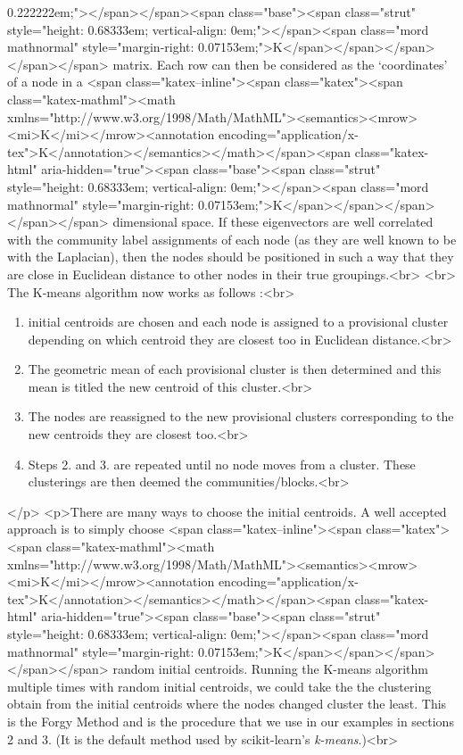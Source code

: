 0.222222em;"></span></span><span class="base"><span class="strut" style="height: 0.68333em; vertical-align: 0em;"></span><span class="mord mathnormal" style="margin-right: 0.07153em;">K</span></span></span></span></span> matrix. Each row can then be considered as the ‘coordinates’ of a node in a <span class="katex--inline"><span class="katex"><span class="katex-mathml"><math xmlns="http://www.w3.org/1998/Math/MathML"><semantics><mrow><mi>K</mi></mrow><annotation encoding="application/x-tex">K</annotation></semantics></math></span><span class="katex-html" aria-hidden="true"><span class="base"><span class="strut" style="height: 0.68333em; vertical-align: 0em;"></span><span class="mord mathnormal" style="margin-right: 0.07153em;">K</span></span></span></span></span> dimensional space. If these eigenvectors are well correlated with the community label assignments of each node (as they are well known to be with the Laplacian), then the nodes should be positioned in such a way that they are close in Euclidean distance to other nodes in their true groupings.<br>
\newline<br>
The K-means algorithm now works as follows \cite{MacQueen1967}:<br>
\begin{enumerate}<br>
\item initial centroids are chosen and each node is assigned to a provisional cluster depending on which centroid they are closest too in Euclidean distance.<br>
\item The geometric mean of each provisional cluster is then determined and this mean is titled the new centroid of this cluster.<br>
\item The nodes are reassigned to the new provisional clusters corresponding to the new centroids they are closest too.<br>
\item Steps 2. and 3. are repeated until no node moves from a cluster. These clusterings are then deemed the communities/blocks.<br>
\end{enumerate}</p>
<p>There are many ways to choose the initial centroids. A well accepted approach is to simply choose <span class="katex--inline"><span class="katex"><span class="katex-mathml"><math xmlns="http://www.w3.org/1998/Math/MathML"><semantics><mrow><mi>K</mi></mrow><annotation encoding="application/x-tex">K</annotation></semantics></math></span><span class="katex-html" aria-hidden="true"><span class="base"><span class="strut" style="height: 0.68333em; vertical-align: 0em;"></span><span class="mord mathnormal" style="margin-right: 0.07153em;">K</span></span></span></span></span> random initial centroids. Running the K-means algorithm multiple times with random initial centroids, we could take the the clustering obtain from the initial centroids where the nodes changed cluster the least. This is the Forgy Method \cite{Forgy65} and is the procedure that we use in our examples in sections 2 and 3. (It is the default method used by scikit-learn’s \textit{k-means}.)<br>
